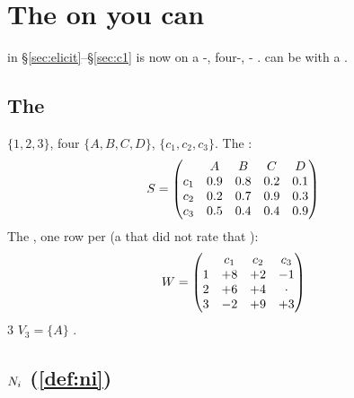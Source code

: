 \section{The   on  you can }
\label{sec:toy}

 in §\ref{sec:elicit}--§\ref{sec:c1} is now  on a
-, four-, - .    can be
 with a .

\subsection{The }

  $\{1,2,3\}$, four  $\{A,B,C,D\}$,  
$\{c_1,c_2,c_3\}$. The  :
\[
S=\begin{pmatrix}
 & A & B & C & D\\
c_1 & 0.9 & 0.8 & 0.2 & 0.1\\
c_2 & 0.2 & 0.7 & 0.9 & 0.3\\
c_3 & 0.5 & 0.4 & 0.4 & 0.9
\end{pmatrix}
\]
The , one row per  (a   that  did not rate
that ):
\[
W=\begin{pmatrix}
 & c_1 & c_2 & c_3\\
1 & +8 & +2 & -1\\
2 & +6 & +4 & \cdot\\
3 & -2 & +9 & +3
\end{pmatrix}
\]
 $3$   $V_3 = \{A\}$ .

\subsection{  $N_i$ (\cref{def:ni})}

